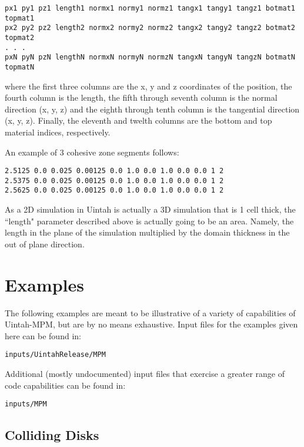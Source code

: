 \begin{Verbatim}
px1 py1 pz1 length1 normx1 normy1 normz1 tangx1 tangy1 tangz1 botmat1 topmat1
px2 py2 pz2 length2 normx2 normy2 normz2 tangx2 tangy2 tangz2 botmat2 topmat2
. . .
pxN pyN pzN lengthN normxN normyN normzN tangxN tangyN tangzN botmatN topmatN
\end{Verbatim}

where the first three columns are the x, y and z coordinates of the position, 
the fourth column is the length, the fifth through seventh column is the normal
direction (x, y, z) and the eighth through tenth column is the tangential
direction (x, y, z).  Finally, the eleventh and twelth columns are the bottom
and top material indices, respectively.

An example of 3 cohesive zone segments follows:

\begin{Verbatim}
2.5125 0.0 0.025 0.00125 0.0 1.0 0.0 1.0 0.0 0.0 1 2
2.5375 0.0 0.025 0.00125 0.0 1.0 0.0 1.0 0.0 0.0 1 2
2.5625 0.0 0.025 0.00125 0.0 1.0 0.0 1.0 0.0 0.0 1 2
\end{Verbatim}

As a 2D simulation in Uintah is actually a 3D simulation that is 1 cell thick,
the ``length" parameter described above is actually going to be an area.
Namely, the length in the plane of the simulation multiplied by the domain
thickness in the out of plane direction.

%
\section{Examples} \label{Sec:ExamplesMPM}

The following examples are meant to be illustrative of a variety of
capabilities of Uintah-MPM, but are by no means exhaustive.  Input files
for the examples given here can be found in:
\begin{Verbatim}[fontsize=\footnotesize]
inputs/UintahRelease/MPM
\end{Verbatim}

Additional (mostly undocumented) input files that exercise a greater range
of code capabilities can be found in:
\begin{Verbatim}[fontsize=\footnotesize]
inputs/MPM
\end{Verbatim}


\subsection*{\center Colliding Disks}
